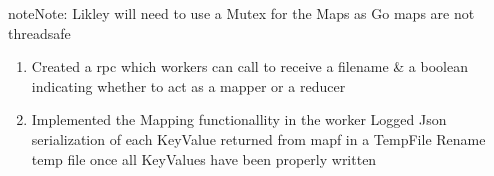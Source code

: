 \documentclass[letterpaper,10pt,english]{sphinxmanual}
\begin{document}
\begin{sphinxadmonition}{note}{Note:}
Likley will need to use a Mutex for the Maps as Go maps are not threadsafe
\end{sphinxadmonition}
\begin{enumerate}
%
\setcounter{enumi}{1}
\item {} 
Created a rpc  which workers can call to receive a filename \& a boolean indicating
whether to act as a mapper or a reducer

\item {} 
Implemented the Mapping functionallity in the worker
\sphinxhyphen{} Logged Json serialization of each KeyValue returned from mapf in a TempFile
\sphinxhyphen{} Rename temp file once all KeyValues have been properly written

\end{enumerate}
\end{document}
